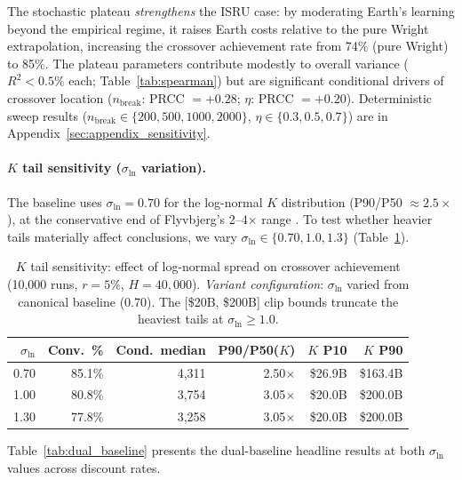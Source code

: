 \documentclass[preprint,12pt]{elsarticle}
\begin{document}
The stochastic plateau \emph{strengthens} the ISRU case: by moderating Earth's learning beyond the empirical regime, it raises Earth costs relative to the pure Wright extrapolation, increasing the crossover achievement rate from 74\% (pure Wright) to 85\%. The plateau parameters contribute modestly to overall variance ($R^2 < 0.5\%$ each; Table~\ref{tab:spearman}) but are significant conditional drivers of crossover location ($n_{\mathrm{break}}$: PRCC $= +0.28$; $\eta$: PRCC $= +0.20$). Deterministic sweep results ($n_{\mathrm{break}} \in \{200,500,1000,2000\}$, $\eta \in \{0.3,0.5,0.7\}$) are in Appendix~\ref{sec:appendix_sensitivity}.

\paragraph{$K$ tail sensitivity ($\sigma_{\ln}$ variation).} The baseline uses $\sigma_{\ln} = 0.70$ for the log-normal $K$ distribution (P90/P50 $\approx 2.5\times$), at the conservative end of Flyvbjerg's 2--4$\times$ range \cite{flyvbjerg2014}. To test whether heavier tails materially affect conclusions, we vary $\sigma_{\ln} \in \{0.70, 1.0, 1.3\}$ (Table~\ref{tab:sigma_ln}).

\begin{table}[htbp]
\centering
\caption{$K$ tail sensitivity: effect of log-normal spread on crossover achievement (10{,}000 runs, $r = 5\%$, $H = 40{,}000$). \emph{Variant configuration}: $\sigma_{\ln}$ varied from canonical baseline (0.70). The [\$20B, \$200B] clip bounds truncate the heaviest tails at $\sigma_{\ln} \geq 1.0$.}
\label{tab:sigma_ln}
\small
\begin{tabular}{@{}rrrrrr@{}}
\toprule
$\sigma_{\ln}$ & Conv.\ \% & Cond.\ median & P90/P50($K$) & $K$ P10 & $K$ P90 \\
\midrule
0.70 & 85.1\% & 4{,}311 & 2.50$\times$ & \$26.9B & \$163.4B \\
1.00 & 80.8\% & 3{,}754 & 3.05$\times$ & \$20.0B & \$200.0B \\
1.30 & 77.8\% & 3{,}258 & 3.05$\times$ & \$20.0B & \$200.0B \\
\bottomrule
\end{tabular}
\end{table}

Table~\ref{tab:dual_baseline} presents the dual-baseline headline results at both $\sigma_{\ln}$ values across discount rates.
\end{document}
